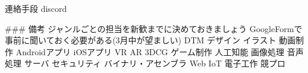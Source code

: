         連絡手段
            discord

### 備考
    ジャンルごとの担当を新歓までに決めておきましょう
    GoogleFormで事前に聞いておく必要がある(3月中が望ましい)
        DTM
        デザイン
        イラスト
        動画制作
        Androidアプリ
        iOSアプリ
        VR
        AR
        3DCG
        ゲーム制作
        人工知能
        画像処理
        音声処理
        サーバ
        セキュリティ
        バイナリ・アセンブラ
        Web
        IoT
        電子工作
        競プロ


        
                    
                
        

    

    

